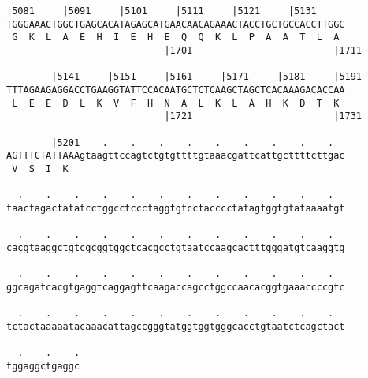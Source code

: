 \documentclass{article}
\begin{document}
\begin{Verbatim}[fontfamily=courier]
        |5081     |5091     |5101     |5111     |5121     |5131
TGGGAAACTGGCTGAGCACATAGAGCATGAACAACAGAAACTACCTGCTGCCACCTTGGC
 G  K  L  A  E  H  I  E  H  E  Q  Q  K  L  P  A  A  T  L  A 
                            |1701                         |1711

        |5141     |5151     |5161     |5171     |5181     |5191
TTTAGAAGAGGACCTGAAGGTATTCCACAATGCTCTCAAGCTAGCTCACAAAGACACCAA
 L  E  E  D  L  K  V  F  H  N  A  L  K  L  A  H  K  D  T  K 
                            |1721                         |1731

        |5201    .    .    .    .    .    .    .    .    .  
AGTTTCTATTAAAgtaagttccagtctgtgttttgtaaacgattcattgcttttcttgac
 V  S  I  K                                                 

  .    .    .    .    .    .    .    .    .    .    .    .  
taactagactatatcctggcctccctaggtgtcctacccctatagtggtgtataaaatgt

  .    .    .    .    .    .    .    .    .    .    .    .  
cacgtaaggctgtcgcggtggctcacgcctgtaatccaagcactttgggatgtcaaggtg

  .    .    .    .    .    .    .    .    .    .    .    .  
ggcagatcacgtgaggtcaggagttcaagaccagcctggccaacacggtgaaaccccgtc

  .    .    .    .    .    .    .    .    .    .    .    .  
tctactaaaaatacaaacattagccgggtatggtggtgggcacctgtaatctcagctact

  .    .    .
tggaggctgaggc
\end{Verbatim}
\newpage
\end{document}
